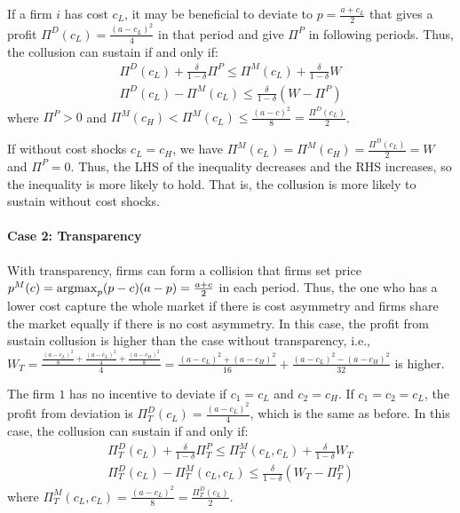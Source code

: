 \documentclass[12pt]{article}
\newcommand{\argmax}{\operatornamewithlimits{argmax}}
\begin{document}
If a firm $i$ has cost $c_L$, it may be beneficial to deviate to $p=\frac{a+c_L}{2}$ that gives a profit $\Pi^D(c_L)=\frac{(a-c_L)^2}{4}$ in that period and give $\Pi^P$ in following periods. Thus, the collusion can sustain if and only if:
\begin{equation}
    \begin{aligned}
        \Pi^D(c_L)+\frac{\delta}{1-\delta}\Pi^P\leq \Pi^M(c_L)+\frac{\delta}{1-\delta}W\\
        \Pi^D(c_L)-\Pi^M(c_L)\leq \frac{\delta}{1-\delta}(W-\Pi^P)
        \end{aligned}
        \nonumber
\end{equation}
where $\Pi^P>0$ and $\Pi^M(c_H)<\Pi^M(c_L)\leq\frac{(a-c)^2}{8}=\frac{\Pi^D(c_L)}{2}$.

If without cost shocks $c_L=c_H$, we have $\Pi^M(c_L)=\Pi^M(c_H)=\frac{\Pi^D(c_L)}{2}=W$ and $\Pi^P=0$. Thus, the LHS of the inequality decreases and the RHS increases, so the inequality is more likely to hold. That is, the collusion is more likely to sustain without cost shocks.

\paragraph{Case 2: Transparency}
With transparency, firms can form a collision that firms set price $p^M(c)=\argmax_p (p-c)(a-p)=\frac{a+c}{2}$ in each period. Thus, the one who has a lower cost capture the whole market if there is cost asymmetry and firms share the market equally if there is no cost asymmetry. In this case, the profit from sustain collusion is higher than the case without transparency, i.e., $W_T=\frac{\frac{(a-c_L)^2}{8}+\frac{(a-c_L)^2}{4}+\frac{(a-c_H)^2}{8}}{4}=\frac{(a-c_L)^2+(a-c_H)^2}{16}+\frac{(a-c_L)^2-(a-c_H)^2}{32}$ is higher.

The firm $1$ has no incentive to deviate if $c_1=c_L$ and $c_2=c_H$. If $c_1=c_2=c_L$, the profit from deviation is $\Pi^D_T(c_L)=\frac{(a-c_L)^2}{4}$, which is the same as before. In this case, the collusion can sustain if and only if:
\begin{equation}
    \begin{aligned}
        \Pi^D_T(c_L)+\frac{\delta}{1-\delta}\Pi^P_T\leq \Pi^M_T(c_L,c_L)+\frac{\delta}{1-\delta}W_T\\
        \Pi^D_T(c_L)-\Pi^M_T(c_L,c_L)\leq \frac{\delta}{1-\delta}(W_T-\Pi^P_T)
    \end{aligned}
    \nonumber
\end{equation}
where $\Pi^M_T(c_L,c_L)=\frac{(a-c_L)^2}{8}=\frac{\Pi^D_T(c_L)}{2}$.
\end{document}
